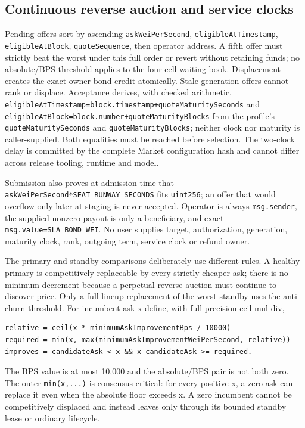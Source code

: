 \documentclass[a4paper,11pt]{article}
\newcommand{\code}[1]{\nolinkurl{#1}}
\begin{document}
\subsection{Continuous reverse auction and service clocks}

Pending offers sort by ascending \code{askWeiPerSecond},
\code{eligibleAtTimestamp}, \code{eligibleAtBlock}, \code{quoteSequence}, then
operator address.  A fifth offer must strictly beat the worst under this full
order or revert without retaining funds; no absolute/BPS threshold applies to
the four-cell waiting book.  Displacement creates the exact owner bond credit
atomically.  Stale-generation offers cannot rank or displace.
Acceptance derives, with checked arithmetic,
\code{eligibleAtTimestamp=block.timestamp+quoteMaturitySeconds} and
\code{eligibleAtBlock=block.number+quoteMaturityBlocks} from the profile's
\code{quoteMaturitySeconds} and \code{quoteMaturityBlocks}; neither clock nor
maturity is caller-supplied.  Both equalities must be
reached before selection.  The two-clock delay is committed by the complete
Market configuration hash and cannot differ across release tooling, runtime and
model.

Submission also proves at admission time that
\code{askWeiPerSecond*SEAT_RUNWAY_SECONDS} fits \code{uint256}; an offer that
would overflow only later at staging is never accepted.  Operator is always
\code{msg.sender}, the supplied nonzero payout is only a beneficiary, and exact
\code{msg.value=SLA_BOND_WEI}.  No user supplies target, authorization,
generation, maturity clock, rank, outgoing term, service clock or refund owner.

The primary and standby comparisons deliberately use different rules.  A
healthy primary is competitively replaceable by every strictly cheaper ask;
there is no minimum decrement because a perpetual reverse auction must continue
to discover price.  Only a full-lineup replacement of the worst standby uses
the anti-churn threshold.  For incumbent ask x define, with full-precision
ceil-mul-div,
\begin{verbatim}
relative = ceil(x * minimumAskImprovementBps / 10000)
required = min(x, max(minimumAskImprovementWeiPerSecond, relative))
improves = candidateAsk < x && x-candidateAsk >= required.
\end{verbatim}
The BPS value is at most 10,000 and the absolute/BPS pair is not both zero.  The
outer \code{min(x,...)} is consensus critical: for every positive x, a zero ask
can replace it even when the absolute floor exceeds x.  A zero incumbent cannot
be competitively displaced and instead leaves only through its bounded standby
lease or ordinary lifecycle.
\end{document}
